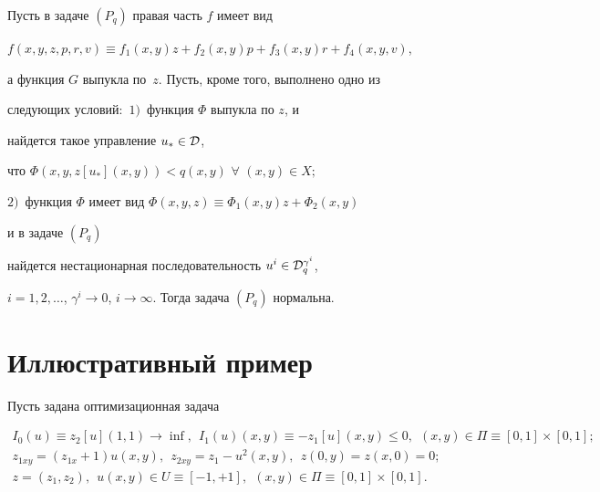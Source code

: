\begin{thms}


Пусть в задаче $(P_q)$ правая часть $f$ имеет вид


$f(x,y,z,p,r,v)\equiv f_1(x,y)z+f_2(x,y)p+f_3(x,y)r+f_4(x,y,v)$,


а функция $G$ выпукла по~$z$. Пусть, кроме того, выполнено одно из 


следующих условий\/${:}$ $1)$~функция $\Phi$ выпукла по $z$, и 


найдется такое управление $u_*\in {\cal D}$,


что $\Phi(x,y,z[u_*](x,y))<q(x,y)$ \; $\forall$ $(x,y)\in X;$


$2)$~функция $\Phi$ имеет вид $\Phi(x,y,z)\equiv\Phi_1(x,y)z+\Phi_2(x,y)$


и в задаче $(P_q)$


найдется нестационарная последовательность $u^i\in {\cal D}^{\gamma^i}_q$,


$i=1,2,\dotsc$, $\gamma^i\to0$, $i\to\infty$. Тогда задача $(P_q)$ нормальна.


\end{thms}








\section{Иллюстративный пример}





Пусть задана оптимизационная задача


\begin{gather*}


I_0(u)\equiv z_2[u](1, 1)\to\inf,\ \  I_1(u)(x, y)\equiv-z_1[u](x, y)\leq


0,\ \  (x, y)\in \Pi\equiv[0,1]\times[0,1];\\


%


z_{1 xy}=(z_{1 x}+1)u(x, y),


\ \ z_{2 xy}=z_1-u^2(x, y),\ \  z(0, y)=z(x, 0)=0;\\


%


z=(z_1, z_2),\ \ u(x, y)\in U\equiv[-1, +1],


\ \  (x,y)\in\Pi\equiv[0, 1]\times[0, 1].


\end{gather*}


